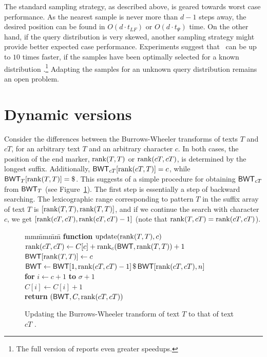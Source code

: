The standard sampling strategy, as described above, is geared towards worst case performance. As the nearest sample is never more than $d-1$ steps away, the desired position can be found in $O(d \cdot t_{LF})$ or $O(d \cdot t_{\Psi})$ time. On the other hand, if the query distribution is very skewed, another sampling strategy might provide better expected case performance. Experiments suggest that \locate\ can be up to $10$ times faster, if the samples have been optimally selected for a known distribution \cite{Ferragina2011}.\footnote{The full version of \cite{Ferragina2011} reports even greater speedups.} Adapting the samples for an unknown query distribution remains an open problem.


\section{Dynamic versions}\label{sect:dynamic indexes}

Consider the differences between the Burrows-Wheeler transforms of texts $T$ and $cT$, for an arbitrary text $T$ and an arbitrary character $c$. In both cases, the position of the end marker, $\operatorname{rank}(T,T)$ or $\operatorname{rank}(cT,cT)$, is determined by the longest suffix. Additionally, $\mathsf{BWT}_{cT}[\operatorname{rank}(cT,T)] = c$, while $\BWT_{T}[\mrank(T,T)] = \$$. This suggests of a simple procedure for obtaining $\mathsf{BWT}_{cT}$ from $\mathsf{BWT}_{T}$ (see Figure~\ref{fig:bwt update}). The first step is essentially a step of backward searching. The lexicographic range corresponding to pattern $T$ in the suffix array of text $T$ is $[\operatorname{rank}(T,T), \operatorname{rank}(T,T)]$, and if we continue the search with character $c$, we get $[\operatorname{rank}(cT,cT), \operatorname{rank}(cT,cT) - 1]$ (note that $\operatorname{rank}(T,cT) = \operatorname{rank}(cT,cT)$).

\begin{figure}
\begin{tabbing}
mm\=mm\=mm\= \kill
\> \textbf{function} $\operatorname{update}(\operatorname{rank}(T,T), c)$ \\
\> \> $\operatorname{rank}(cT,cT) \leftarrow C[c] + \operatorname{rank}_{c}(\mathsf{BWT}, \operatorname{rank}(T,T)) + 1$ \\
\> \> $\mathsf{BWT}[\operatorname{rank}(T,T)] \leftarrow c$ \\
\> \> $\mathsf{BWT} \leftarrow \mathsf{BWT}[1, \operatorname{rank}(cT,cT) - 1] \, \$ \, \mathsf{BWT}[\operatorname{rank}(cT,cT), n]$ \\
\> \> \textbf{for} $i \leftarrow c+1$ \textbf{to} $\sigma+1$ \\
\> \> \> $C[i] \leftarrow C[i] + 1$ \\
\> \> \textbf{return} $(\mathsf{BWT}, C, \operatorname{rank}(cT,cT))$
\end{tabbing}

\caption{Updating the Burrows-Wheeler transform of text $T$ to that of text $cT$ \cite{Hon2007}.}\label{fig:bwt update}
\end{figure}

